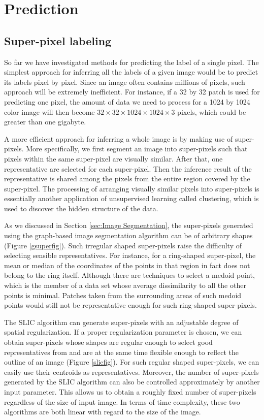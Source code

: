 \section{Prediction}
\label{sec:Prediction}

\subsection{Super-pixel labeling}
\label{sec:Super-pixel labeling}
So far we have investigated methods for predicting the label of a single pixel. The simplest approach for inferring all the labels of a given image would be to predict its labels pixel by pixel. Since an image often contains millions of pixels, such approach will be extremely inefficient. For instance, if a 32 by 32 patch is used for predicting one pixel, the amount of data we need to process for a 1024 by 1024 color image will then become $32\times32\times1024\times1024\times3$ pixels, which could be greater than one gigabyte.

A more efficient approach for inferring a whole image is by making use of super-pixels. More specifically, we first segment an image into super-pixels such that pixels within the same super-pixel are visually similar. After that, one representative are selected for each super-pixel. Then the inference result of the representative is shared among the pixels from the entire region covered by the super-pixel. The processing of arranging visually similar pixels into super-pixels is essentially another application of unsupervised learning called clustering, which is used to discover the hidden structure of the data.

As we discussed in Section \ref{sec:Image Segmentation}, the super-pixels generated using the graph-based image segmentation algorithm can be of arbitrary shapes (Figure \ref{gsuperfig}). Such irregular shaped super-pixels raise the difficulty of selecting sensible representatives. For instance, for a ring-shaped super-pixel, the mean or median of the coordinates of the points in that region in fact does not belong to the ring itself. Although there are techniques to select a medoid point, which is the member of a data set whose average dissimilarity to all the other points is minimal. Patches taken from the surrounding areas of such medoid points would still not be representative enough for such ring-shaped super-pixels.

The SLIC algorithm can generate super-pixels with an adjustable degree of spatial regularization. If a proper regularization parameter is chosen, we can obtain super-pixels whose shapes are regular enough to select good representatives from and are at the same time flexible enough to reflect the outline of an image (Figure \ref{slicfig}). For such regular shaped super-pixels, we can easily use their centroids as representatives. Moreover, the number of super-pixels generated by the SLIC algorithm can also be controlled approximately by another input parameter. This allows us to obtain a roughly fixed number of super-pixels regardless of the size of input image. In terms of time complexity, these two algorithms are both linear with regard to the size of the image.

